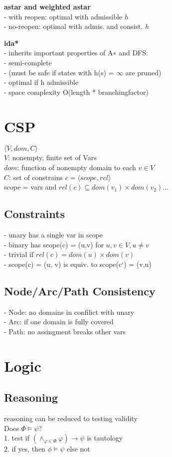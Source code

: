 \textbf{astar and weighted astar} \\
- with reopen: optimal with admissible $h$\\
- no-reopen: optimal with admis. and consist. $h$

\textbf{ida*} \\
- inherits important properties of A∗ and DFS: \\
- semi-complete \\
- (must be safe if states with h(s) = $\infty$ are pruned) \\
- optimal if h admissible \\
- space complexity O(length * branchingfactor)

\section*{CSP}
$\langle V, dom, C\rangle$ \\
$V$: nonempty, finite set of Vars \\
$dom$: function of nonempty domain to each $v \in V$ \\
$C$: set of constrains $c = \langle scope, rel\rangle$ \\
scope = vars and $rel(c) \subseteq dom(v_1) \times dom(v_2) ...$

\subsection*{Constraints}
- unary has a single var in scope \\
- binary has scope(c) = (u,v) for $u, v \in V, u \neq v$ \\
- trivial if $rel(c) = dom(u) \times dom(v)$ \\
- scope(c) = (u, v) is equiv. to scope(c`) = (v,u)

\subsection*{Node/Arc/Path Consistency}
- Node: no domains in confilict with unary\\ 
- Arc: if one domain is fully covered \\
- Path: no assingment breaks other vars


\section*{Logic}
\subsection*{Reasoning}
reasoning can be reduced to testing validity \\
Does $\Phi \models \psi$? \\
1. test if $(\wedge_{\varphi \in \Phi}\varphi) \rightarrow \psi$ is tautology \\
2. if yes, then $\phi \models \psi$ else not

